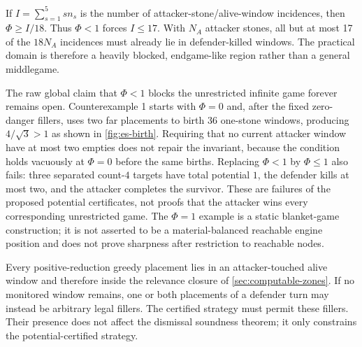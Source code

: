 If $I=\sum_{s=1}^5s n_s$ is the number of attacker-stone/alive-window
incidences, then $\Phi\ge I/18$.  Thus $\Phi<1$ forces $I\le17$.  With $N_A$
attacker stones, all but at most 17 of the $18N_A$ incidences must already lie
in defender-killed windows.  The practical domain is therefore a heavily
blocked, endgame-like region rather than a general middlegame.

The raw global claim that $\Phi<1$ blocks the unrestricted infinite game
forever remains open.  Counterexample 1 starts with $\Phi=0$ and, after the
fixed zero-danger fillers, uses two far placements to birth 36 one-stone
windows, producing $4/\sqrt3>1$ as shown in \cref{fig:es-birth}.  Requiring
that no current attacker window have at most two empties does not repair the
invariant, because the condition holds vacuously at $\Phi=0$ before the same
births.  Replacing $\Phi<1$ by $\Phi\le1$ also fails: three separated count-$4$
targets have total potential $1$, the defender kills at most two, and the
attacker completes the survivor.  These are failures of the proposed
potential certificates, not proofs that the attacker wins every corresponding
unrestricted game.  The $\Phi=1$ example is a static blanket-game
construction; it is not asserted to be a material-balanced reachable engine
position and does not prove sharpness after restriction to reachable nodes.

Every positive-reduction greedy placement lies in an attacker-touched alive
window and therefore inside the relevance closure of \cref{sec:computable-zones}.
If no monitored window remains, one or both placements of a defender turn may
instead be arbitrary legal fillers.  The certified strategy must permit these
fillers.  Their presence does not affect the dismissal soundness theorem; it
only constrains the potential-certified strategy.
